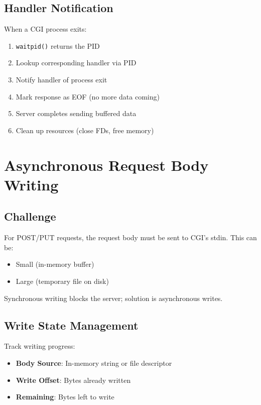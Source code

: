 \documentclass[12pt,a4paper]{article}
\begin{document}
\subsection{Handler Notification}

When a CGI process exits:
\begin{enumerate}
    \item \texttt{waitpid()} returns the PID
    \item Lookup corresponding handler via PID
    \item Notify handler of process exit
    \item Mark response as EOF (no more data coming)
    \item Server completes sending buffered data
    \item Clean up resources (close FDs, free memory)
\end{enumerate}

\section{Asynchronous Request Body Writing}

\subsection{Challenge}

For POST/PUT requests, the request body must be sent to CGI's stdin. This can be:
\begin{itemize}
    \item Small (in-memory buffer)
    \item Large (temporary file on disk)
\end{itemize}

Synchronous writing blocks the server; solution is asynchronous writes.

\subsection{Write State Management}

Track writing progress:
\begin{itemize}
    \item \textbf{Body Source}: In-memory string or file descriptor
    \item \textbf{Write Offset}: Bytes already written
    \item \textbf{Remaining}: Bytes left to write
\end{itemize}
\end{document}
